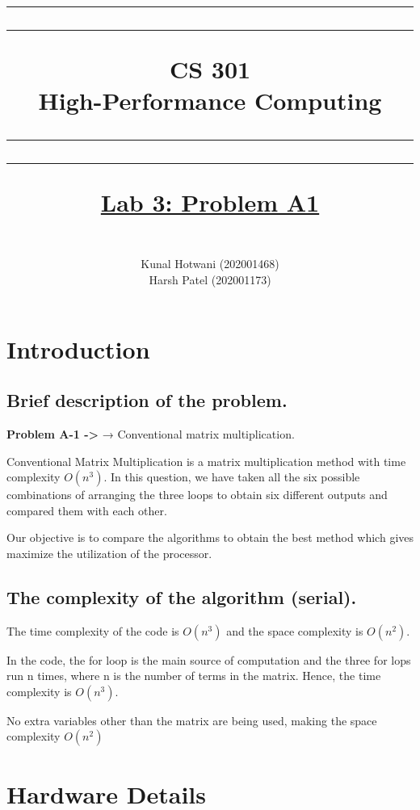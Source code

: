 \documentclass[article, 11pt]{article}
\title{
    \begin{spacing}{0.1}
        \rule{\textwidth}{0.5pt}
        \rule{\textwidth}{0.5pt}
    \end{spacing}
    \vspace{1cm}
    \Huge\textbf{CS 301 \\High-Performance Computing}
    \vspace{0.7cm}
    \begin{spacing}{0.1}
        \rule{\textwidth}{0.5pt}
        \rule{\textwidth}{0.5pt}
    \end{spacing}

    \vspace{6cm}
    {\Huge{\underline{Lab 3: Problem A1}}}
}
\author{
    \vspace{5cm}
    \\Kunal Hotwani (202001468)
    \\Harsh Patel (202001173)
}
\begin{document}
\maketitle

\newpage
\tableofcontents

\newpage
\section{Introduction}



\subsection{Brief description of the problem.}


\textbf{ Problem A-1 ->} → Conventional matrix multiplication.

\vspace{3mm}

 Conventional Matrix Multiplication is a matrix multiplication method with time complexity $O(n^3)$. In this question, we have taken all the six possible combinations of arranging the three loops to obtain six different outputs and compared them with each other.

\vspace{1mm}


 Our objective is to compare the algorithms to obtain the best method which gives maximize the utilization of the processor.

 

\subsection{The complexity of the algorithm (serial).}

\vspace{3mm} 
The time complexity of the code is $O(n^3)$ and the space complexity is $O(n^2)$.

\vspace{1mm}
In the code, the for loop is the main source of computation and the three for lops run n times, where n is the number of terms in the matrix. Hence, the time complexity is $O(n^3)$.

\vspace{1mm}
No extra variables other than the matrix are being used, making the space complexity $O(n^2)$


\section{Hardware Details}
\end{document}

